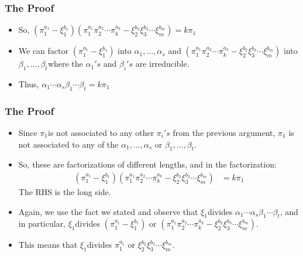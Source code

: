 \begin{frame}
  \frametitle{The Proof}
  \begin{itemize}
    \item So, $(\pi_{1}^{a_{1}}-\xi_{1}^{b_{1}})(\pi_{1}^{a_{1}}\pi_{2}^{a_{2}}\cdots\pi_{k}^{a_{k}}-\xi_{2}^{b_{2}}\xi_{3}^{b_{3}}\cdots\xi_{m}^{b_{m}})=k\pi_{1}$
  \end{itemize}

  \pause{}
  \begin{itemize}
    \item We can factor $(\pi_{1}^{a_{1}}-\xi_{1}^{b_{1}})$ into $\alpha_{1},\ldots,\alpha_{s}$ and $(\pi_{1}^{a_{1}}\pi_{2}^{a_{2}}\cdots\pi_{k}^{a_{k}}-\xi_{2}^{b_{2}}\xi_{3}^{b_{3}}\cdots\xi_{m}^{b_{m}})$ into $\beta_{1},\ldots,\beta_{t}$where the $\alpha_{1}'s$ and $\beta_{i}'s$ are irreducible. 
  \end{itemize}

  \pause{}
  \begin{itemize}
    \item Thus, $\alpha_{1}\cdots\alpha_{s}$$\beta_{1}\cdots\beta_{t}=k\pi_{1}$ 
  \end{itemize}
\end{frame}

\begin{frame}
  \frametitle{The Proof}
  \begin{itemize}
    \item Since $\pi_{1}$is not associated to any other $\pi_{i}'s$ from the previous argument, $\pi_{1}$ is not associated to any of the $\alpha_{1},\ldots,\alpha_{s}$ or $\beta_{1},\ldots,\beta_{t}$. 
  \end{itemize}

  \pause{}
  \begin{itemize}
    \item So, these are factorizations of different lengths, and in the factorization:
      \begin{align*}
	(\pi_{1}^{a_{1}}-\xi_{1}^{b_{1}})(\pi_{1}^{a_{1}}\pi_{2}^{a_{2}}\cdots\pi_{k}^{a_{k}}-\xi_{2}^{b_{2}}\xi_{3}^{b_{3}}\cdots\xi_{m}^{b_{m}}) & =k\pi_{1}
      \end{align*}
      The RHS is the long side. 
  \end{itemize}

  \pause{}
  \begin{itemize}
    \item Again, we use the fact we stated and observe that $\xi_{1}$divides $\alpha_{1}\cdots\alpha_{s}$$\beta_{1}\cdots\beta_{t}$, and in particular, $\xi_{1}$divides $(\pi_{1}^{a_{1}}-\xi_{1}^{b_{1}})$ or $(\pi_{1}^{a_{1}}\pi_{2}^{a_{2}}\cdots\pi_{k}^{a_{k}}-\xi_{2}^{b_{2}}\xi_{3}^{b_{3}}\cdots\xi_{m}^{b_{m}}).$
    \item This means that $\xi_{1}$divides $\pi_{1}^{a_{1}}$ or $\xi_{2}^{b_{2}}\xi_{3}^{b_{3}}\cdots\xi_{m}^{b_{m}}$.
  \end{itemize}
\end{frame}

